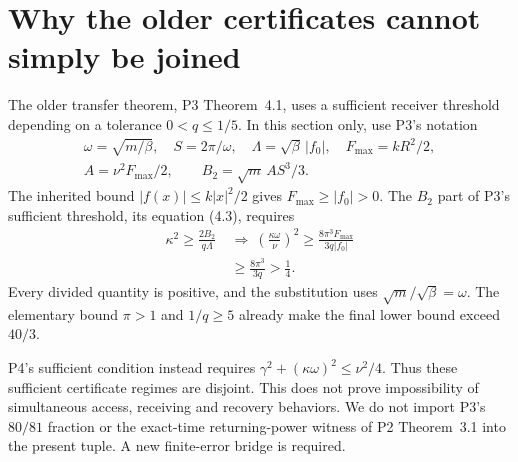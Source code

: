 \section{Why the older certificates cannot simply be joined}\label{sec:compatibility}
The older transfer theorem, P3 Theorem~4.1, uses a sufficient receiver threshold depending on a tolerance $0<q\le1/5$. In this section only, use P3's notation
\begin{equation}\label{eq:oldconstants}
\begin{gathered}
 \omega=\sqrt{m/\beta},\quad S=2\pi/\omega,\quad
 \Lambda=\sqrt\beta\,|f_0|,\quad F_{\max}=kR^2/2,\\
 A=\nu^2F_{\max}/2,\qquad B_2=\sqrt m\,AS^3/3 .
\end{gathered}
\end{equation}
The inherited bound $|f(x)|\le k|x|^2/2$ gives $F_{\max}\ge|f_0|>0$. The $B_2$ part of P3's sufficient threshold, its equation (4.3), requires
\begin{equation}\label{eq:incompatibility}%
\begin{aligned}
 \kappa^2\ge\frac{2B_2}{q\Lambda}
 &\ \Longrightarrow\
 \left(\frac{\kappa\omega}{\nu}\right)^2
 \ge\frac{8\pi^3F_{\max}}{3q|f_0|}\\
 &\ \ge\frac{8\pi^3}{3q}>\frac14 .
\end{aligned}
\end{equation}
Every divided quantity is positive, and the substitution uses $\sqrt m/\sqrt\beta=\omega$. The elementary bound $\pi>1$ and $1/q\ge5$ already make the final lower bound exceed $40/3$.

P4's sufficient condition instead requires $\gamma^2+(\kappa\omega)^2\le\nu^2/4$. Thus these sufficient certificate regimes are disjoint. This does not prove impossibility of simultaneous access, receiving and recovery behaviors. We do not import P3's $80/81$ fraction or the exact-time returning-power witness of P2 Theorem~3.1 into the present tuple. A new finite-error bridge is required.
